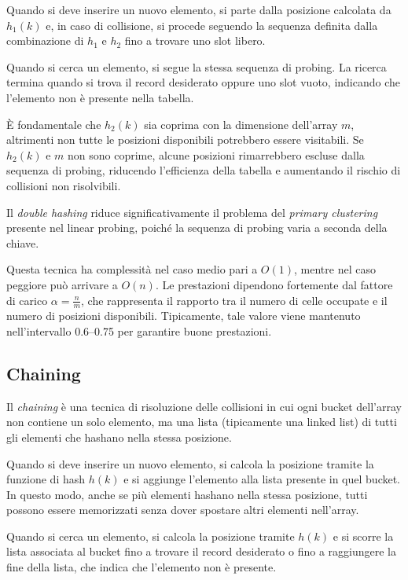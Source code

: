 Quando si deve inserire un nuovo elemento, si parte dalla posizione calcolata da $h_1(k)$ e, in caso di collisione, si procede seguendo 
la sequenza definita dalla combinazione di $h_1$ e $h_2$ fino a trovare uno slot libero.

Quando si cerca un elemento, si segue la stessa sequenza di probing. La ricerca termina quando si trova il record desiderato oppure uno 
slot vuoto, indicando che l’elemento non è presente nella tabella.

È fondamentale che $h_2(k)$ sia coprima con la dimensione dell’array $m$, altrimenti non tutte le posizioni disponibili potrebbero essere 
visitabili. Se $h_2(k)$ e $m$ non sono coprime, alcune posizioni rimarrebbero escluse dalla sequenza di probing, riducendo l’efficienza 
della tabella e aumentando il rischio di collisioni non risolvibili.

Il \textit{double hashing} riduce significativamente il problema del \textit{primary clustering} presente nel linear probing, poiché la 
sequenza di probing varia a seconda della chiave.

Questa tecnica ha complessità nel caso medio pari a $O(1)$, mentre nel caso peggiore può arrivare a $O(n)$. Le prestazioni dipendono fortemente 
dal fattore di carico $\alpha = \frac{n}{m}$, che rappresenta il rapporto tra il numero di celle occupate e il numero di posizioni disponibili. 
Tipicamente, tale valore viene mantenuto nell’intervallo 0.6–0.75 per garantire buone prestazioni.

\subsection{Chaining}

Il \textit{chaining} è una tecnica di risoluzione delle collisioni in cui ogni bucket dell’array non contiene un solo elemento, 
ma una lista (tipicamente una linked list) di tutti gli elementi che hashano nella stessa posizione.

Quando si deve inserire un nuovo elemento, si calcola la posizione tramite la funzione di hash $h(k)$ e si aggiunge l’elemento 
alla lista presente in quel bucket. In questo modo, anche se più elementi hashano nella stessa posizione, tutti possono essere memorizzati 
senza dover spostare altri elementi nell’array.

Quando si cerca un elemento, si calcola la posizione tramite $h(k)$ e si scorre la lista associata al bucket fino a trovare il record 
desiderato o fino a raggiungere la fine della lista, che indica che l’elemento non è presente.

